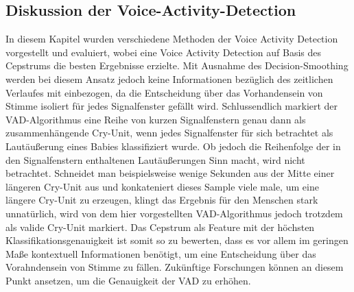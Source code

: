 \subsection{Diskussion der Voice-Activity-Detection}

In diesem Kapitel wurden verschiedene Methoden der Voice Activity Detection vorgestellt und evaluiert, wobei eine Voice Activity Detection auf Basis des Cepstrums die besten Ergebnisse erzielte. Mit Ausnahme des Decision-Smoothing werden bei diesem Ansatz jedoch keine Informationen bezüglich des zeitlichen Verlaufes mit einbezogen, da die Entscheidung über das Vorhandensein von Stimme isoliert für jedes Signalfenster gefällt wird. Schlussendlich markiert der VAD-Algorithmus eine Reihe von kurzen Signalfenstern genau dann als zusammenhängende Cry-Unit, wenn jedes Signalfenster für sich betrachtet als Lautäußerung eines Babies klassifiziert wurde. Ob jedoch die Reihenfolge der in den Signalfenstern enthaltenen Lautäußerungen Sinn macht, wird nicht betrachtet. Schneidet man beispielsweise wenige Sekunden aus der Mitte einer längeren Cry-Unit aus und konkateniert dieses Sample viele male, um eine längere Cry-Unit zu erzeugen, klingt das Ergebnis für den Menschen stark unnatürlich, wird von dem hier vorgestellten VAD-Algorithmus jedoch trotzdem als valide Cry-Unit markiert. Das Cepstrum als Feature mit der höchsten Klassifikationsgenauigkeit ist somit so zu bewerten, dass es vor allem im geringen Maße kontextuell Informationen benötigt, um eine Entscheidung über das Vorahndensein von Stimme zu fällen. Zukünftige Forschungen können an diesem Punkt ansetzen, um die Genauigkeit der VAD zu erhöhen.





